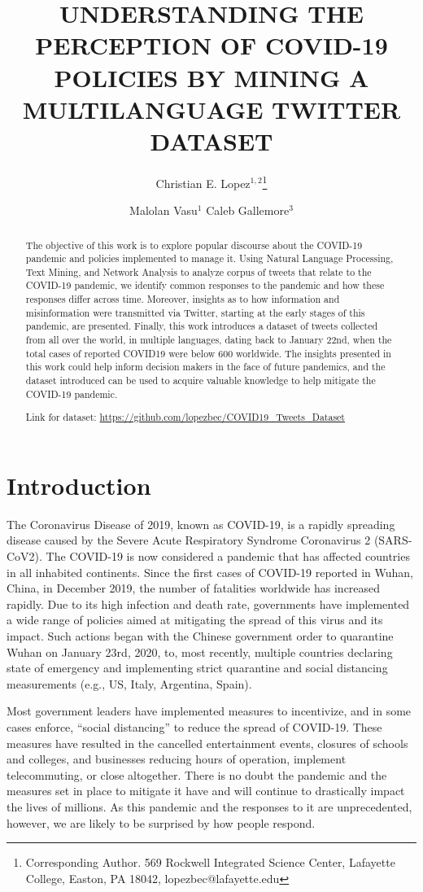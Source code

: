 \documentclass{article}
\title{UNDERSTANDING THE PERCEPTION OF COVID-19 POLICIES
BY MINING A MULTILANGUAGE TWITTER DATASET}
\author{
Christian E. Lopez$^{1,2}$\footnote{Corresponding Author. 569 Rockwell Integrated Science Center, Lafayette College, Easton, PA 18042,
lopezbec@lafayette.edu}\and
Malolan Vasu$^1$\And
Caleb Gallemore$^{3}$
\affiliations{\footnotesize
$^1$ Computer Science Department, Lafayette College, Easton, PA 18042\\
$^2$ Mechanical Engineering Department, Lafayette College, Easton, PA 18042\\
$^3$ International Affairs Program, Lafayette College, Easton, PA 18042\\
}
}
\begin{document}
\maketitle

\begin{abstract}
    The objective of this work is to explore popular discourse about the COVID-19 pandemic and policies implemented to manage it. Using Natural Language Processing, Text Mining, and Network Analysis to analyze corpus of tweets that relate to the COVID-19 pandemic, we identify common responses to the pandemic and how these responses differ across time. Moreover, insights as to how information and misinformation were transmitted via Twitter, starting at the early stages of this pandemic, are presented. Finally, this work introduces a dataset of tweets collected from all over the world, in multiple languages, dating back to January 22nd, when the total cases of reported COVID19 were below 600 worldwide. The insights presented in this work could help inform decision makers in the face of future pandemics, and the dataset introduced can be used to acquire valuable knowledge to help mitigate the COVID-19 pandemic.

    Link for dataset: \url{https://github.com/lopezbec/COVID19_Tweets_Dataset}
\end{abstract}

\section{Introduction}

The Coronavirus Disease of 2019, known as COVID-19, is a rapidly spreading disease caused by the Severe Acute Respiratory Syndrome Coronavirus 2 (SARS-CoV2). The COVID-19 is now considered a pandemic that has affected countries in all inhabited continents. Since the first cases of COVID-19 reported in Wuhan, China, in December 2019, the number of fatalities worldwide has increased rapidly. Due to its high infection and death rate, governments have implemented a wide range of policies aimed at mitigating the spread of this virus and its impact. Such actions began with the Chinese government order to quarantine Wuhan on January 23rd, 2020, to, most recently, multiple countries declaring state of emergency and implementing strict quarantine and social distancing measurements (e.g., US, Italy, Argentina, Spain).

Most government leaders have implemented measures to incentivize, and in some cases enforce, “social distancing” to reduce the spread of COVID-19. These measures have resulted in the cancelled entertainment events, closures of schools and colleges, and businesses reducing hours of operation, implement telecommuting, or close altogether. There is no doubt the pandemic and the measures set in place to mitigate it have and will continue to drastically impact the lives of millions. As this pandemic and the responses to it are unprecedented, however, we are likely to be surprised by how people respond.
\end{document}
